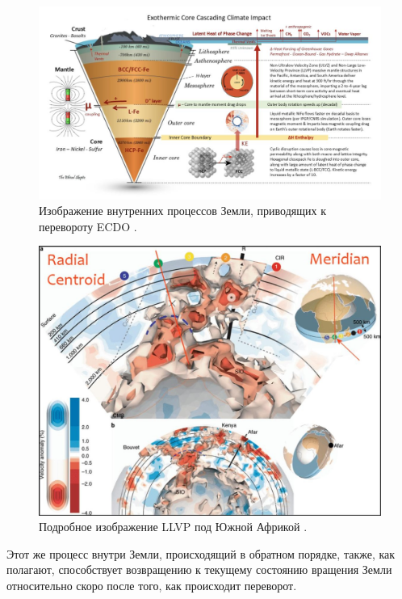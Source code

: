 \documentclass[10pt,twocolumn,letterpaper]{article}
\begin{document}
\begin{figure}[t]
\begin{center}
\includegraphics[width=1\textwidth]{layers.jpg}
\end{center}
   \caption{Изображение внутренних процессов Земли, приводящих к перевороту ECDO \cite{129}.}
\label{fig:11}
\end{figure}
\begin{figure}[t]
\begin{center}
   \includegraphics[width=1\linewidth]{llvp.jpg}
\end{center}
   \caption{Подробное изображение LLVP под Южной Африкой \cite{28}.}
\label{fig:12}
\label{fig:onecol}
\end{figure}

Этот же процесс внутри Земли, происходящий в обратном порядке, также, как полагают, способствует возвращению к текущему состоянию вращения Земли относительно скоро после того, как происходит переворот.
\end{document}

